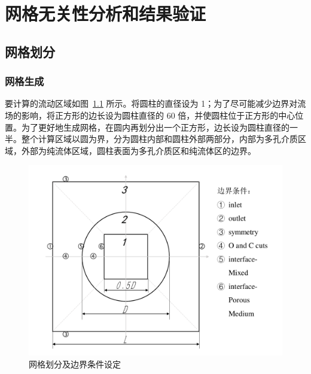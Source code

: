\chapter{网格无关性分析和结果验证}\label{chap: validation}

\section{网格划分}\label{sec: grid}

\subsection{网格生成}

要计算的流动区域如图~\ref{fig: grid} 所示。将圆柱的直径设为 1；为了尽可能减少边界对流场的影响，将正方形的边长设为圆柱直径的 60 倍，并使圆柱位于正方形的中心位置。为了更好地生成网格，在圆内再划分出一个正方形，边长设为圆柱直径的一半。整个计算区域以圆为界，分为圆柱内部和圆柱外部两部分，内部为多孔介质区域，外部为纯流体区域，圆柱表面为多孔介质区和纯流体区的边界。

\begin{figure}
	\centering
	\includegraphics[scale=.7]{figs/grid}
	\caption{网格划分及边界条件设定}\label{fig: grid}
\end{figure}

